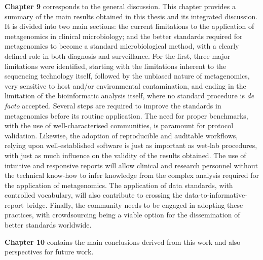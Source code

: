 \textbf{Chapter 9} corresponds to the general discussion. This chapter provides a summary of the main results obtained in this thesis and its integrated discussion. It is divided into two main sections: the current limitations to the application of metagenomics in clinical microbiology; and the better standards required for metagenomics to become a standard microbiological method, with a clearly defined role in both diagnosis and surveillance. For the first, three major limitations were identified, starting with the limitations inherent to the sequencing technology itself, followed by the unbiased nature of metagenomics, very sensitive to host and/or environmental contamination, and ending in the limitation of the bioinformatic analysis itself, where no standard procedure is \textit{de facto} accepted. Several steps are required to improve the standards in metagenomics before its routine application. The need for proper benchmarks, with the use of well-characterised communities, is paramount for protocol validation. Likewise, the adoption of reproducible and auditable workflows, relying upon well-established software is just as important as wet-lab procedures, with just as much influence on the validity of the results obtained. The use of intuitive and responsive reports will allow clinical and research personnel without the technical know-how to infer knowledge from the complex analysis required for the application of metagenomics. The application of data standards, with controlled vocabulary, will also contribute to crossing the data-to-informative-report bridge. Finally, the community needs to be engaged in adopting these practices, with crowdsourcing being a viable option for the dissemination of better standards worldwide. 

\textbf{Chapter 10} contains the main conclusions derived from this work and also perspectives for future work. 
